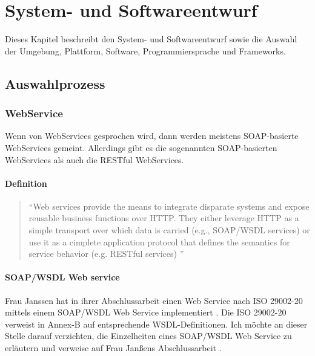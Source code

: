\chapter{System- und Softwareentwurf} \label{kap:systemundsoftwarentwurf}


Dieses Kapitel beschreibt den System- und Softwareentwurf sowie die Auswahl der Umgebung, Plattform, Software, Programmiersprache und Frameworks.

\section{Auswahlprozess}

\subsection{WebService}
Wenn von WebServices gesprochen wird, dann werden meistens SOAP-basierte WebServices gemeint. Allerdings gibt es die sogenannten SOAP-basierten WebServices als auch die RESTful WebServices. 

\subsubsection{Definition}

\begin{quotation}
\enquote{Web services provide the means to integrate disparate systems and expose reusable business functions over HTTP. They either leverage HTTP as a simple transport over which data is carried (e.g., SOAP/WSDL services) or use it as a cimplete application protocol that defines the semantics for service behavior (e.g. RESTful services) \citep[S. 2][]{robinsonService}}	
\end{quotation}

\subsubsection{SOAP/WSDL Web service}
Frau Janssen hat in ihrer Abschlussarbeit einen Web Service nach ISO 29002-20 mittels einem SOAP/WSDL Web Service implementiert \citep[vgl.][]{janssen}. Die ISO 29002-20 verweist in Annex-B auf entsprechende WSDL-Definitionen. 
Ich möchte an dieser Stelle darauf verzichten, die Einzelheiten eines SOAP/WSDL Web Service zu erläutern und verweise auf Frau Janßens Abschlussarbeit \citep[vgl.][Kap. 3]{janssen}. 

